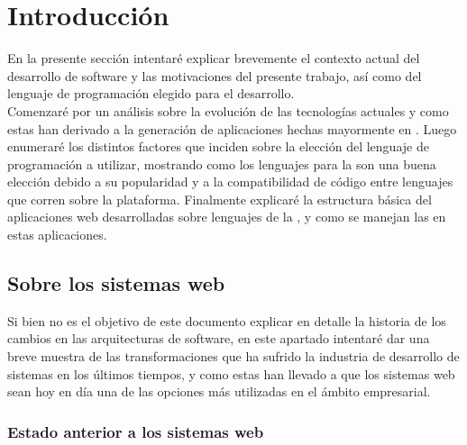 \section{Introducción}
\label{sec:intro}

En la presente sección intentaré explicar brevemente el contexto actual del desarrollo
de software y las motivaciones del presente trabajo, así como del lenguaje de programación
elegido para el desarrollo.\\
Comenzaré por un análisis sobre la evolución de las tecnologías actuales y como estas
han derivado a la generación de aplicaciones hechas mayormente en \htmlv. Luego enumeraré
los distintos factores que inciden sobre la elección del lenguaje de programación a
utilizar, mostrando como los lenguajes para la \jvm son una buena elección debido a su
popularidad y a la compatibilidad de código entre lenguajes que corren sobre la
plataforma. Finalmente explicaré la estructura básica del aplicaciones web desarrolladas
sobre lenguajes de la \jvm, y como se manejan las \dependencies en estas aplicaciones.\\

\subsection{Sobre los sistemas web}
\label{subsec:intro:about_web}

Si bien no es el objetivo de este documento explicar en detalle la historia de los cambios
en las arquitecturas de software, en este apartado intentaré dar una breve muestra de las
transformaciones que ha sufrido la industria de desarrollo de sistemas en los últimos
tiempos, y como estas han llevado a que los sistemas web sean hoy en día una de las
opciones más utilizadas en el ámbito empresarial.

\subsubsection{Estado anterior a los sistemas web}
\label{subsubsec:intro:about_web:previous_pc}

